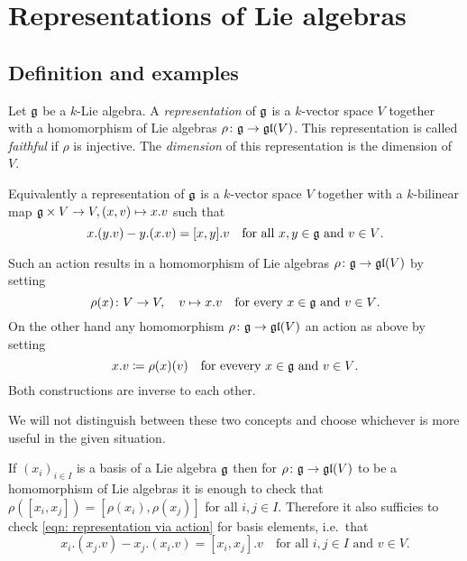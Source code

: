 \section{Representations of Lie algebras}





\subsection{Definition and examples}


\begin{definition}
 Let $\mathfrak{g}$ be a $k$-Lie algebra. A \emph{representation} of $\mathfrak{g}$ is a $k$-vector space $V$ together with a homomorphism of Lie algebras $\rho \colon \mathfrak{g} \to \mathfrak{gl}(V)$. This representation is called \emph{faithful} if $\rho$ is injective. The \emph{dimension} of this representation is the dimension of $V$.
\end{definition}


\begin{remark}
 Equivalently a representation of $\mathfrak{g}$ is a $k$-vector space $V$ together with a $k$-bilinear map $\mathfrak{g} \times V \to V, (x,v) \mapsto x.v$ such that
 \begin{equation}\label{eqn: representation via action}
  x.(y.v) - y.(x.v) = [x,y].v \quad \text{for all $x,y \in \mathfrak{g}$ and $v \in V$}.
 \end{equation}
 
 Such an action results in a homomorphism of Lie algebras $\rho \colon \mathfrak{g} \to \mathfrak{gl}(V)$ by setting
 \[
  \rho(x) \colon V \to V, \quad v \mapsto x.v
  \quad \text{for every $x \in \mathfrak{g}$ and $v \in V$}.
 \]
 On the other hand any homomorphism $\rho \colon \mathfrak{g} \to \mathfrak{gl}(V)$ an action as above by setting
 \[
  x.v \coloneqq \rho(x)(v) \quad \text{for evevery $x \in \mathfrak{g}$ and $v \in V$}.
 \]
 Both constructions are inverse to each other.

 We will not distinguish between these two concepts and choose whichever is more useful in the given situation.
\end{remark}


\begin{remark}
 If $(x_i)_{i \in I}$ is a basis of a Lie algebra $\mathfrak{g}$ then for $\rho \colon \mathfrak{g} \to \mathfrak{gl}(V)$ to be a homomorphism of Lie algebras it is enough to check that $\rho([x_i,x_j])= [\rho(x_i), \rho(x_j)]$ for all $i,j \in I$. Therefore it also sufficies to check \eqref{eqn: representation via action} for basis elements, i.e.\ that
 \[
  x_i.(x_j.v) - x_j.(x_i.v) = [x_i, x_j].v \quad \text{for all $i,j \in I$ and $v \in V$}.
 \]
\end{remark}


